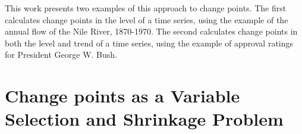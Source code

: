 \documentclass[12pt]{article}
\begin{document}
This work presents two examples of this approach to change points.
The first calculates change points in the level of a time series, using the example of the annual flow of the Nile River, 1870-1970.
The second calculates change points in both the level and trend of a time series, using the example of approval ratings for President George W. Bush.




\section{Change points as a Variable Selection and Shrinkage Problem}
\label{dlm:sec:chang-as-vari}
\end{document}
